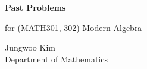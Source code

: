 \documentclass[11pt,oneside]{article}
\begin{document}
\thispagestyle{empty}

\begin{center}
    \vspace*{1.1cm}

    {\LARGE\bfseries Past Problems\par}

    \vspace{0.25cm}

    {\large for (MATH301, 302) Modern Algebra\par}

    \vspace{0.75cm}

    {\normalsize
    Jungwoo Kim\\
    Department of Mathematics\\
    \PohangUniversityOfScienceAndTechnology
    \par}
\end{center}
\end{document}

